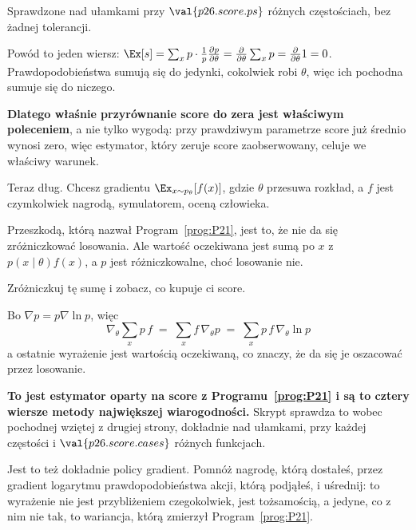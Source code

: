 \begin{fr}

Sprawdzone nad ułamkami przy $\val{p26.score.ps}$ różnych częstościach, bez
żadnej tolerancji.

Powód to jeden wiersz: $\Ex[s] = \sum_x p \cdot \frac{1}{p}
\frac{\partial p}{\partial \theta} = \frac{\partial}{\partial \theta}
\sum_x p = \frac{\partial}{\partial \theta} 1 = 0$. Prawdopodobieństwa sumują
się do jedynki, cokolwiek robi $\theta$, więc ich pochodna sumuje się do
niczego.

\textbf{Dlatego właśnie przyrównanie score do zera jest właściwym
poleceniem}, a nie tylko wygodą: przy prawdziwym parametrze score już średnio
wynosi zero, więc estymator, który zeruje score zaobserwowany, celuje we
właściwy warunek.
\end{fr}

\begin{fr}
Teraz dług. Chcesz gradientu $\Ex_{x \sim p_\theta}[f(x)]$, gdzie $\theta$
przesuwa rozkład, a $f$ jest czymkolwiek \dash{} nagrodą, symulatorem, oceną
człowieka.

Przeszkodą, którą nazwał Program~\ref{prog:P21}, jest to, że nie da się
zróżniczkować losowania. Ale wartość oczekiwana jest sumą po $x$ z
$p(x \mid \theta) f(x)$, a $p$ jest różniczkowalne, choć losowanie nie.

Zróżniczkuj tę sumę i zobacz, co kupuje ci score.
\dotline
\nextframe
\end{fr}

\begin{fr}

Bo $\nabla p = p \nabla \ln p$, więc
\[ \nabla_\theta \sum_x p\,f
   \;=\; \sum_x f\,\nabla_\theta p
   \;=\; \sum_x p\, f\, \nabla_\theta \ln p \]
a ostatnie wyrażenie jest wartością oczekiwaną, co znaczy, że da się je
oszacować przez losowanie.

\textbf{To jest estymator oparty na score z Programu~\ref{prog:P21} i są to
cztery wiersze metody największej wiarogodności.} Skrypt sprawdza to wobec
pochodnej wziętej z drugiej strony, dokładnie nad ułamkami, przy każdej
częstości i $\val{p26.score.cases}$ różnych funkcjach.

Jest to też dokładnie policy gradient. Pomnóż nagrodę, którą dostałeś, przez
gradient logarytmu prawdopodobieństwa akcji, którą podjąłeś, i uśrednij: to
wyrażenie nie jest przybliżeniem czegokolwiek, jest tożsamością, a jedyne, co
z nim nie tak, to wariancja, którą zmierzył Program~\ref{prog:P21}.
\end{fr}

